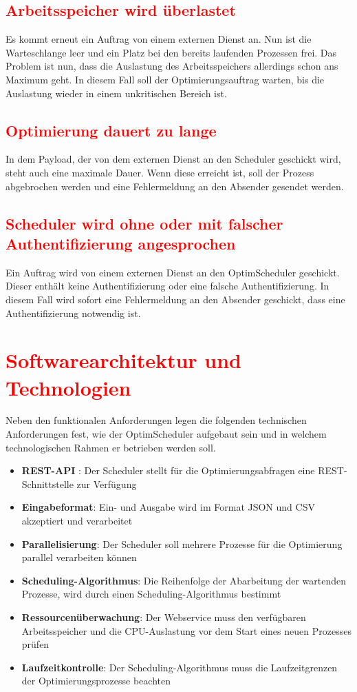 \documentclass[
    12pt,               
    a4paper,            
    ngerman,            
    parskip=half,       
    headings=normal,   
    numbers=enddot,     
    toc=chapterentrywithdots 
]{scrreprt}\usepackage[utf8]{inputenc}
\begin{document}
\subsection{\textcolor{red}{Arbeitsspeicher wird überlastet}}
Es kommt erneut ein Auftrag von einem externen Dienst an. Nun ist die Warteschlange leer und ein Platz bei den bereits laufenden Prozessen frei. Das Problem ist nun, dass die Auslastung des Arbeitsspeichers allerdings schon ans Maximum geht. In diesem Fall soll der Optimierungsauftrag warten, bis die Auslastung wieder in einem unkritischen Bereich ist.

\subsection{\textcolor{red}{Optimierung dauert zu lange}}
In dem Payload, der von dem externen Dienst an den Scheduler geschickt wird, steht auch eine maximale Dauer. Wenn diese erreicht ist, soll der Prozess abgebrochen werden und eine Fehlermeldung an den Absender gesendet werden.

\subsection{\textcolor{red}{Scheduler wird ohne oder mit falscher Authentifizierung angesprochen}}
Ein Auftrag wird von einem externen Dienst an den OptimScheduler geschickt. Dieser enthält keine Authentifizierung oder eine falsche Authentifizierung. In diesem Fall wird sofort eine Fehlermeldung an den Absender geschickt, dass eine Authentifizierung notwendig ist.

\section{\textcolor{red}{Softwarearchitektur und Technologien}}
Neben den funktionalen Anforderungen legen die folgenden technischen Anforderungen fest, wie der OptimScheduler aufgebaut sein und in welchem technologischen Rahmen er betrieben werden soll.
\begin{itemize}
    \item \textbf{REST-API} \citep[Vgl.][S.76ff]{fielding2000}: Der Scheduler stellt für die Optimierungsabfragen eine REST-Schnittstelle zur Verfügung
    \item \textbf{Eingabeformat}: Ein- und Ausgabe wird im Format JSON und CSV akzeptiert und verarbeitet
    \item \textbf{Parallelisierung}: Der Scheduler soll mehrere Prozesse für die Optimierung parallel verarbeiten können
    \item \textbf{Scheduling-Algorithmus}: Die Reihenfolge der Abarbeitung der wartenden Prozesse, wird durch einen Scheduling-Algorithmus bestimmt
    \item \textbf{Ressourcenüberwachung}: Der Webservice muss den verfügbaren Arbeitsspeicher und die CPU-Auslastung vor dem Start eines neuen Prozesses prüfen
    \item \textbf{Laufzeitkontrolle}: Der Scheduling-Algorithmus muss die Laufzeitgrenzen der Optimierungsprozesse beachten
\end{itemize}
\end{document}
